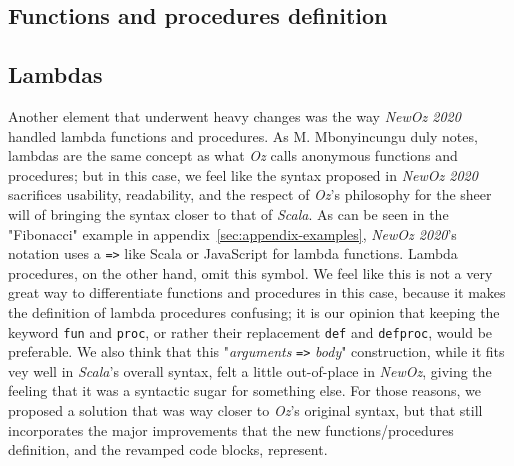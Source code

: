 \subsection{Functions and procedures definition}

\subsection{Lambdas}
Another element that underwent heavy changes was the way \textit{NewOz 2020} handled lambda functions and procedures.
As M. Mbonyincungu duly notes, lambdas are the same concept as what \textit{Oz} calls anonymous functions and procedures;
but in this case, we feel like the syntax proposed in \textit{NewOz 2020} sacrifices usability, readability, and the respect of \textit{Oz}'s philosophy for the sheer will of bringing the syntax closer to that of \textit{Scala}.
As can be seen in the "Fibonacci" example in appendix~\ref{sec:appendix-examples}, \textit{NewOz 2020}'s notation uses a \texttt{=>} like Scala or JavaScript for lambda functions.
Lambda procedures, on the other hand, omit this symbol.
We feel like this is not a very great way to differentiate functions and procedures in this case, because it makes the definition of lambda procedures confusing;
it is our opinion that keeping the keyword \texttt{fun} and \texttt{proc}, or rather their replacement \texttt{def} and \texttt{defproc}, would be preferable.
We also think that this "\textit{arguments} \texttt{=>} \textit{body}" construction, while it fits vey well in \textit{Scala}'s overall syntax, felt a little out-of-place in \textit{NewOz}, giving the feeling that it was a syntactic sugar for something else.
For those reasons, we proposed a solution that was way closer to \textit{Oz}'s original syntax, but that still incorporates the major improvements that the new functions/procedures definition, and the revamped code blocks, represent.\newline


